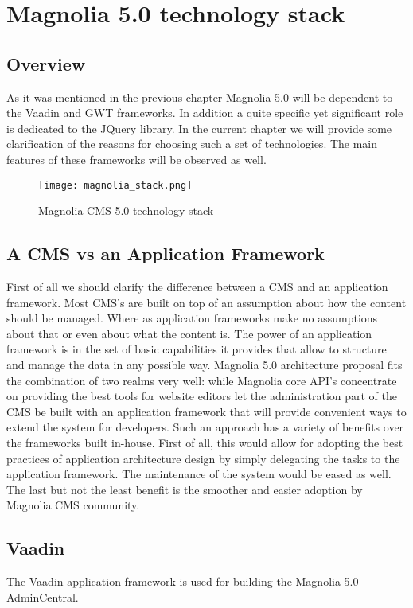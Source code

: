 \chapter{Magnolia 5.0 technology stack}
\label{chapter_tech_stack}
\section{Overview}
As it was mentioned in the previous chapter Magnolia 5.0 will be dependent to the 
Vaadin and GWT frameworks. In addition a quite specific yet significant role is
dedicated to the JQuery library. In the current chapter we will provide some
clarification of the reasons for choosing such a set of technologies. The main
features of these frameworks will be observed as well.
\begin{figure}[H] \centering
\texttt{[image: magnolia\_stack.png]}
	\caption{Magnolia CMS 5.0 technology stack}
	\label{fig:technology_stack}
\end{figure}

\section{A CMS vs an Application Framework}
First of all we should clarify the difference between a CMS and an application
framework. Most CMS's are built on top of an assumption about how the content
should be managed. Where as application frameworks make no assumptions about
that or even about what the content is. The power of an application framework is
in the set of basic capabilities it provides that allow to structure and manage
the data in any possible way. Magnolia 5.0 architecture proposal fits the
combination of two realms very well: while Magnolia core API's concentrate on
providing the best tools for website editors \cite{ux_andreas} let the
administration part of the CMS be built with an application framework that will
provide convenient ways to extend the system for developers. Such an approach
has a variety of benefits over the frameworks built in-house. First of all, this
would allow for adopting the best practices of application architecture design
by simply delegating the tasks to the application framework. The maintenance of
the system would be eased as well. The last but not the least benefit is the
smoother and easier adoption by Magnolia CMS community.

\section{Vaadin}
The Vaadin application framework is used for building the Magnolia 5.0
AdminCentral.
 
